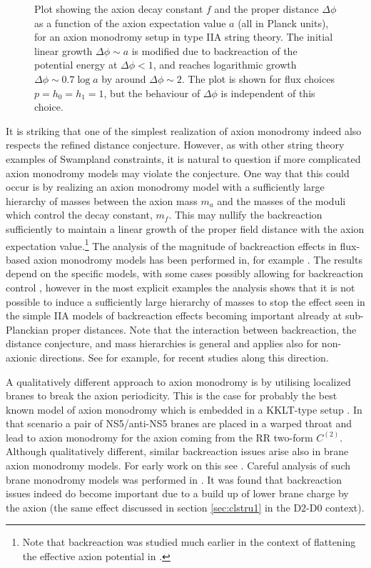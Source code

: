 \documentclass[11pt,a4paper]{article}
\numberwithin{equation}{section}
\numberwithin{table}{section}\setlength{\multlinegap}{25pt}
\begin{document}
{\begin{figure}[t]
\caption{Plot showing the axion decay constant $f$ and the proper distance $\Delta \phi$ as a function of the axion expectation value $a$ (all in Planck units), for an axion monodromy setup in type IIA string theory. The initial linear growth $\Delta \phi \sim a$ is modified due to backreaction of the potential energy at $\Delta \phi < 1$, and reaches logarithmic growth $\Delta \phi \sim 0.7 \log a$ by around $\Delta \phi \sim 2$. The plot is shown for flux choices $p=h_0=h_1=1$, but the behaviour of $\Delta \phi$ is independent of this choice.}
\label{fig:axback}
\end{figure}

It is striking that one of the simplest realization of axion monodromy indeed also respects the refined distance conjecture. However, as with other string theory examples of Swampland constraints, it is natural to question if more complicated axion monodromy models may violate the conjecture. One way that this could occur is by realizing an axion monodromy model with a sufficiently large hierarchy of masses between the axion mass $m_a$ and the masses of the moduli which control the decay constant, $m_f$. This may nullify the backreaction sufficiently to maintain a linear growth of the proper field distance with the axion expectation value.\footnote{Note that backreaction was studied much earlier in the context of flattening the effective axion potential in \cite{Dong:2010in}.} The analysis of the magnitude of backreaction effects in flux-based axion monodromy models has been performed in, for example \cite{Hebecker:2014kva,Blumenhagen:2015kja,Hebecker:2015tzo,Valenzuela:2016yny,Blumenhagen:2017cxt,Blumenhagen:2018hsh,Brown:2016nqt,Buratti:2018xjt}. The results depend on the specific models, with some cases possibly allowing for backreaction control \cite{Hebecker:2014kva}, however in the most explicit examples the analysis shows that it is not possible to induce a sufficiently large hierarchy of masses to stop the effect seen in the simple IIA models of backreaction effects becoming important already at sub-Planckian proper distances. Note that the interaction between backreaction, the distance conjecture, and mass hierarchies is general and applies also for non-axionic directions. See for example, \cite{Andriot:2018tmb} for recent studies along this direction. 

A qualitatively different approach to axion monodromy is by utilising localized branes to break the axion periodicity. This is the case for probably the best known model of axion monodromy which is embedded in a KKLT-type setup \cite{McAllister:2008hb}. In that scenario a pair of NS5/anti-NS5 branes are placed in a warped throat and lead to axion monodromy for the axion coming from the RR two-form $C^{(2)}$. Although qualitatively different, similar backreaction issues arise also in brane axion monodromy models. For early work on this see \cite{Conlon:2011qp}. Careful analysis of such brane monodromy models was performed in \cite{McAllister:2016vzi,Kim:2018vgz}. It was found that backreaction issues indeed do become important due to a build up of lower brane charge by the axion (the same effect discussed in section \ref{sec:clstru1} in the D2-D0 context). 

}
\end{document}
